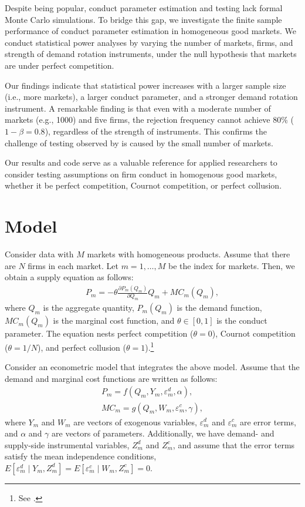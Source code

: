 \documentclass[11pt, a4paper]{article}
\begin{document}
Despite being popular, conduct parameter estimation and testing lack formal Monte Carlo simulations. To bridge this gap, we investigate the finite sample performance of conduct parameter estimation in homogeneous good markets. We conduct statistical power analyses by varying the number of markets, firms, and strength of demand rotation instruments, under the null hypothesis that markets are under perfect competition.

Our findings indicate that statistical power increases with a larger sample size (i.e., more markets), a larger conduct parameter, and a stronger demand rotation instrument. 
A remarkable finding is that even with a moderate number of markets (e.g., 1000) and five firms, the rejection frequency cannot achieve 80\% ($1-\beta=0.8$), regardless of the strength of instruments. 
This confirms the challenge of testing observed by \cite{genesove1998testing} is caused by the small number of markets.

Our results and code serve as a valuable reference for applied researchers to consider testing assumptions on firm conduct in homogenous good markets, whether it be perfect competition, Cournot competition, or perfect collusion.

\section{Model}
Consider data with $M$ markets with homogeneous products.
Assume that there are $N$ firms in each market.
Let $m = 1,\ldots, M$ be the index for markets.
Then, we obtain a supply equation as follows:
\begin{align}
     P_m = -\theta\frac{\partial P_m(Q_{m})}{\partial Q_{m}}Q_{m} + MC_m(Q_{m}),\label{eq:supply_equation}
\end{align}
where $Q_{m}$ is the aggregate quantity, $P_m(Q_{m})$ is the demand function, $MC_{m}(Q_{m})$ is the marginal cost function, and $\theta\in[0,1]$ is  the conduct parameter. 
The equation nests perfect competition ($\theta=0$), Cournot competition ($\theta=1/N$), and perfect collusion ($\theta=1$).\footnote{See \cite{bresnahan1982oligopoly}.} 

Consider an econometric model that integrates the above model.
Assume that the demand and marginal cost functions are written as follows: 
\begin{align}
    P_m = f(Q_{m}, Y_m, \varepsilon^{d}_{m}, \alpha), \label{eq:demand}\\
    MC_m = g(Q_{m}, W_{m}, \varepsilon^{c}_{m}, \gamma),\label{eq:marginal_cost}
\end{align}
where $Y_m$ and $W_{m}$ are vectors of exogenous variables, $\varepsilon^{d}_{m}$ and $\varepsilon^{c}_{m}$ are error terms, and $\alpha$ and $\gamma$ are vectors of parameters.
Additionally, we have demand- and supply-side instrumental variables, $Z^{d}_{m}$ and $Z^{c}_{m}$, and assume that the error terms satisfy the mean independence conditions, $E[\varepsilon^{d}_{m}\mid Y_m, Z^{d}_{m}] = E[\varepsilon^{c}_{m} \mid W_{m}, Z^{c}_{m}] =0$.
\end{document}
